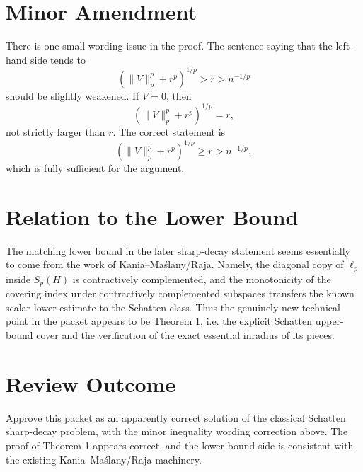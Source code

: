 ﻿\documentclass[11pt]{article}
\begin{document}
\section*{Minor Amendment}

There is one small wording issue in the proof.  The sentence saying that the
left-hand side tends to
\[
  (\|V\|_p^p+r^p)^{1/p}>r>n^{-1/p}
\]
should be slightly weakened.  If \(V=0\), then
\[
  (\|V\|_p^p+r^p)^{1/p}=r,
\]
not strictly larger than \(r\).  The correct statement is
\[
  (\|V\|_p^p+r^p)^{1/p}\ge r>n^{-1/p},
\]
which is fully sufficient for the argument.

\section*{Relation to the Lower Bound}

The matching lower bound in the later sharp-decay statement seems essentially
to come from the work of Kania--Ma\'slany/Raja.  Namely, the diagonal copy of
\(\ell_p\) inside \(S_p(H)\) is contractively complemented, and the monotonicity
of the covering index under contractively complemented subspaces transfers
the known scalar lower estimate to the Schatten class.  Thus the genuinely new
technical point in the packet appears to be Theorem 1, i.e. the explicit
Schatten upper-bound cover and the verification of the exact essential
inradius of its pieces.

\section*{Review Outcome}

Approve this packet as an apparently correct solution of the classical
Schatten sharp-decay problem, with the minor inequality wording correction
above.  The proof of Theorem 1 appears correct, and the lower-bound side is
consistent with the existing Kania--Ma\'slany/Raja machinery.
\end{document}
